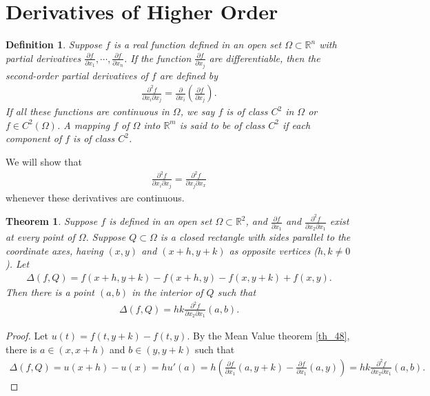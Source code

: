 \documentclass[10pt]{book}
\newtheorem{definition}{Definition}[chapter]
\newtheorem{theorem}{Theorem}[chapter]
\theoremstyle{definition}
\numberwithin{equation}{chapter}
\begin{document}
\medskip


\section{Derivatives of Higher Order}

\begin{definition}
Suppose $f$ is a real function defined in an open set $\Omega \subset \mathbb{R}^n$ with partial derivatives $\frac{\partial f}{\partial x_1}, \cdots, \frac{\partial f}{\partial x_n}$. If the function $\frac{\partial f}{\partial x_j}$ are differentiable, then  the second-order partial derivatives of $f$ are defined by
\begin{align*}
    \frac{\partial^2 f}{\partial x_i \partial x_j} = \frac{\partial}{\partial x_i} \left(\frac{\partial f}{\partial x_j}\right).
\end{align*}
If all these functions are continuous in $\Omega$, we say $f$ is of class $C^2$ in $\Omega$ or $f \in C^2(\Omega)$. A mapping $f$ of $\Omega$ into $\mathbb{R}^m$ is said to be of class $C^2$ if each component of $f$ is of class $C^2$.
\end{definition}

\medskip

We will show that
\begin{align*}
    \frac{\partial^2 f}{\partial x_i \partial x_j} = \frac{\partial^2 f}{\partial x_j \partial x_x}
\end{align*}
whenever these derivatives are continuous.

\medskip

\begin{theorem}\label{th_715}
Suppose $f$ is defined in an open set $\Omega \subset \mathbb{R}^2$, and $\frac{\partial f}{\partial x_1}$ and $\frac{\partial^2 f}{\partial x_2 \partial x_1}$ exist at every point of $\Omega$. Suppose $Q \subset \Omega$ is a closed rectangle with sides parallel to the coordinate axes, having $(x,y)$ and $(x+h,y+k)$ as opposite vertices ($h,k \neq 0$). Let
\begin{align*}
    \Delta (f,Q) = f(x+h,y+k) - f(x+h,y) - f(x,y+k) + f(x,y).
\end{align*}
Then there is a point $(a,b)$ in the interior of $Q$ such that
\begin{align}\label{th_715_equ1}
    \Delta (f,Q) = hk \frac{\partial^2 f}{\partial x_2 \partial x_1}(a,b).
\end{align}
\end{theorem}
\begin{proof}
Let $u(t) = f(t,y+k) - f(t,y)$. By the Mean Value theorem \ref{th_48}, there is $a \in (x,x+h)$ and $b \in (y,y+k)$ such that
\begin{align*}
    \Delta (f,Q) = u(x+h) - u(x) = h u'(a)  = h \left(\frac{\partial f}{\partial x_1}(a,y+k) - \frac{\partial f}{\partial x_1}(a,y)\right) = hk \frac{\partial^2 f}{\partial x_2 \partial x_1}(a,b).
\end{align*}
\end{proof}
\end{document}
